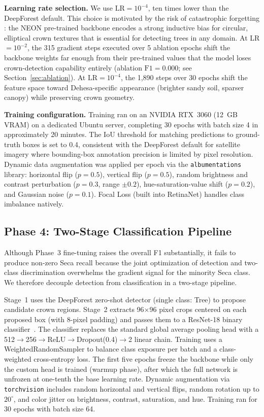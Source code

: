 \documentclass[10pt,twocolumn]{article}
\begin{document}
\textbf{Learning rate selection.}
We use $\text{LR} = 10^{-4}$, ten times lower than the DeepForest default.
This choice is motivated by the risk of catastrophic forgetting
\cite{mccloskey1989catastrophic}: the NEON pre-trained backbone encodes a
strong inductive bias for circular, elliptical crown textures that is
essential for detecting trees in any domain. At LR $= 10^{-2}$, the 315
gradient steps executed over 5 ablation epochs shift the backbone weights
far enough from their pre-trained values that the model loses crown-detection
capability entirely (ablation $\text{F1} = 0.000$; see
Section~\ref{sec:ablation}). At $\text{LR} = 10^{-4}$, the 1,890 steps
over 30 epochs shift the feature space toward Dehesa-specific appearance
(brighter sandy soil, sparser canopy) while preserving crown geometry.

\textbf{Training configuration.}
Training ran on an NVIDIA RTX~3060 (12~GB VRAM) on a dedicated Ubuntu server,
completing 30 epochs with batch size 4 in approximately 20 minutes. The IoU
threshold for matching predictions to ground-truth boxes is set to 0.4,
consistent with the DeepForest default for satellite imagery where bounding-box
annotation precision is limited by pixel resolution. Dynamic data augmentation
was applied per epoch via the \texttt{albumentations} library: horizontal flip
($p = 0.5$), vertical flip ($p = 0.5$), random brightness and contrast
perturbation ($p = 0.3$, range $\pm 0.2$), hue-saturation-value shift
($p = 0.2$), and Gaussian noise ($p = 0.1$). Focal Loss (built into
RetinaNet) handles class imbalance natively.

\subsection{Phase 4: Two-Stage Classification Pipeline}

Although Phase~3 fine-tuning raises the overall F1 substantially, it
fails to produce non-zero Seca recall because the joint optimization of
detection and two-class discrimination overwhelms the gradient signal for
the minority Seca class. We therefore decouple detection from classification
in a two-stage pipeline.

Stage~1 uses the DeepForest zero-shot detector (single class: Tree) to
propose candidate crown regions. Stage~2 extracts 96$\times$96 pixel crops
centered on each proposed box (with 8-pixel padding) and passes them to a
ResNet-18 binary classifier~\cite{he2016deep,deng2009imagenet}. The
classifier replaces the standard global average pooling head with a
512$\rightarrow$256$\rightarrow$ReLU$\rightarrow$Dropout(0.4)$\rightarrow$2
linear chain. Training uses a WeightedRandomSampler to balance class exposure
per batch and a class-weighted cross-entropy loss. The first five epochs
freeze the backbone while only the custom head is trained (warmup phase),
after which the full network is unfrozen at one-tenth the base learning rate.
Dynamic augmentation via \texttt{torchvision} includes random horizontal and
vertical flips, random rotation up to $20^\circ$, and color jitter on
brightness, contrast, saturation, and hue. Training ran for 30 epochs with
batch size 64.
\end{document}
